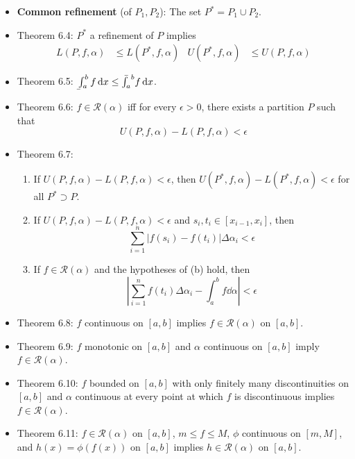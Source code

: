 \documentclass[../../notes.tex]{subfiles}
\begin{document}
\begin{itemize}
    \item \textbf{Common refinement} (of $P_1,P_2$): The set $P^*=P_1\cup P_2$.
    \item Theorem 6.4: $P^*$ a refinement of $P$ implies
    \begin{align*}
        L(P,f,\alpha) &\leq L(P^*,f,\alpha)&
        U(P^*,f,\alpha) &\leq U(P,f,\alpha)
    \end{align*}
    \item Theorem 6.5: $\underaccent{\bar}{\int}_a^bf\dd{x}\leq\bar{\int_a}^bf\dd{x}$.
    \item Theorem 6.6: $f\in\mathscr{R}(\alpha)$ iff for every $\epsilon>0$, there exists a partition $P$ such that
    \begin{equation*}
        U(P,f,\alpha)-L(P,f,\alpha) < \epsilon
    \end{equation*}
    \item Theorem 6.7:
    \begin{enumerate}[label={(\alph*)}]
        \item If $U(P,f,\alpha)-L(P,f,\alpha)<\epsilon$, then $U(P^*,f,\alpha)-L(P^*,f,\alpha)<\epsilon$ for all $P^*\supset P$.
        \item If $U(P,f,\alpha)-L(P,f,\alpha)<\epsilon$ and $s_i,t_i\in[x_{i-1},x_i]$, then
        \begin{equation*}
            \sum_{i=1}^n|f(s_i)-f(t_i)|\Delta\alpha_i < \epsilon
        \end{equation*}
        \item If $f\in\mathscr{R}(\alpha)$ and the hypotheses of (b) hold, then
        \begin{equation*}
            \left| \sum_{i=1}^nf(t_i)\Delta\alpha_i-\int_a^bf\dd{\alpha} \right| < \epsilon
        \end{equation*}
    \end{enumerate}
    \item Theorem 6.8: $f$ continuous on $[a,b]$ implies $f\in\mathscr{R}(\alpha)$ on $[a,b]$.
    \item Theorem 6.9: $f$ monotonic on $[a,b]$ and $\alpha$ continuous on $[a,b]$ imply $f\in\mathscr{R}(\alpha)$.
    \item Theorem 6.10: $f$ bounded on $[a,b]$ with only finitely many discontinuities on $[a,b]$ and $\alpha$ continuous at every point at which $f$ is discontinuous implies $f\in\mathscr{R}(\alpha)$.
    \item Theorem 6.11: $f\in\mathscr{R}(\alpha)$ on $[a,b]$, $m\leq f\leq M$, $\phi$ continuous on $[m,M]$, and $h(x)=\phi(f(x))$ on $[a,b]$ implies $h\in\mathscr{R}(\alpha)$ on $[a,b]$.

\end{itemize}
\end{document}
